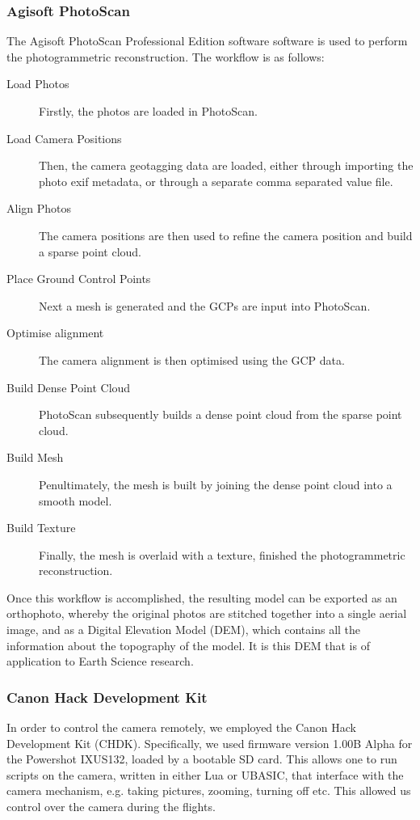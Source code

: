 \subsubsection{Agisoft PhotoScan}

The Agisoft PhotoScan Professional Edition
software
software is used to perform the photogrammetric reconstruction. The workflow is
as follows:

\begin{description}
    \item[Load Photos] Firstly, the photos are loaded in PhotoScan.
    \item[Load Camera Positions] Then, the camera geotagging data are loaded,
        either through importing the photo exif metadata, or through a separate
        comma separated value file.
    \item[Align Photos] The camera positions are then used to refine the camera
        position and build a sparse point cloud.
    \item[Place Ground Control Points] Next a mesh is generated and the GCPs are
        input into PhotoScan.
    \item[Optimise alignment] The camera alignment is then optimised using the
        GCP data.
    \item[Build Dense Point Cloud] PhotoScan subsequently builds a dense point
        cloud from the sparse point cloud.
    \item[Build Mesh] Penultimately, the mesh is built by joining the dense
        point cloud into a smooth model.
    \item[Build Texture] Finally, the mesh is overlaid with a texture, finished
        the photogrammetric reconstruction.
\end{description}

Once this workflow is accomplished, the resulting model can be exported as an
orthophoto, whereby the original photos are stitched together into a single
aerial image, and as a Digital Elevation Model (DEM), which contains all the
information about the topography of the model. It is this DEM that is of
application to Earth Science research.

\subsubsection{Canon Hack Development Kit}

In order to control the camera remotely, we employed the Canon Hack Development
Kit (CHDK). Specifically, we used firmware
version 1.00B Alpha for the Powershot
IXUS132, loaded by a bootable SD
card. This allows one to run scripts on the camera, written in either Lua or
UBASIC, that interface with the camera mechanism, e.g. taking pictures, zooming,
turning off etc. This allowed us control over the camera during the flights.
